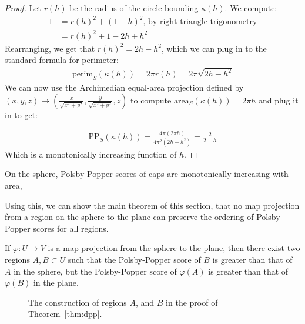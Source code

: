 \begin{proof}
  Let $r(h)$ be the radius of the circle bounding $\kappa(h)$. We
  compute: 
  \begin{align*}
    1 &= r(h)^2 + (1-h)^2 \text {, by right triangle trigonometry}\\ 
      &= r(h)^2 + 1 - 2h+h^2
  \end{align*}
  Rearranging, we get that $r(h)^2= 2h-h^2$, which we can plug in to
  the standard formula for perimeter:
  \begin{align*}
    \mathrm{perim}_S(\kappa(h)) = 2\pi r(h) = 2\pi \sqrt{2h-h^2}
  \end{align*}
  We can now use the Archimedian equal-area projection 
  defined by $(x,y,z) \to
  \left(\frac{x}{\sqrt{x^2+y^2}},\frac{y}{\sqrt{x^2+y^2}}, z\right)$ 
  to compute $\mathrm{area}_S(\kappa(h)) = 2\pi h$ and plug it in to 
  get:

  \begin{align*}
    \mathrm{PP}_S(\kappa(h)) = \frac{4\pi (2\pi h) }{4 \pi^2 (2h-h^2)}
    = \frac{2}{2-h}
  \end{align*}
  Which is a monotonically increasing function of $h$.
\end{proof}
\begin{corollary}\label{cor:capscale}
  On the sphere, Polsby-Popper scores of caps are monotonically
  increasing with area,
\end{corollary}
Using this, we can show the main theorem of this section, that no map
projection from a region on the sphere to the plane can preserve the ordering
of Polsby-Popper scores for all regions.  

\begin{theorem}\label{thm:dpp}
  If $\varphi:U\to V$ is a map projection from the sphere to the plane,
  then there exist two regions $A,B\subset U$ such that
  the Polsby-Popper score of $B$ is greater than that of $A$ in the
  sphere, but the Polsby-Popper score of $\varphi(A)$ is greater than
  that of $\varphi(B)$ in the plane.
\end{theorem}
\begin{figure}[h]
  \centering

  \caption{The construction of regions $A$, and $B$ in the
  proof of Theorem~\ref{thm:dpp}.} 
\label{fig:dpp}
\end{figure}

